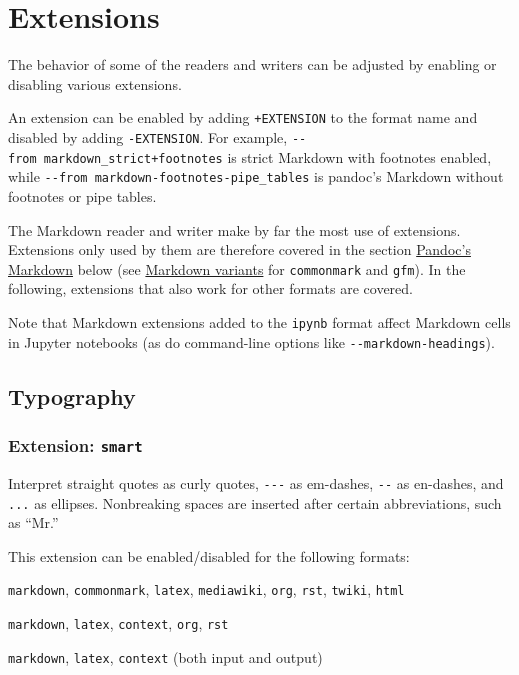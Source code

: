 \documentclass[
]{article}
\providecommand{\tightlist}{%
  \setlength{\itemsep}{0pt}\setlength{\parskip}{0pt}}
\begin{document}
\hypertarget{extensions}{%
\section{Extensions}\label{extensions}}

The behavior of some of the readers and writers can be adjusted by
enabling or disabling various extensions.

An extension can be enabled by adding \texttt{+EXTENSION} to the format
name and disabled by adding \texttt{-EXTENSION}. For example,
\texttt{-\/-from\ markdown\_strict+footnotes} is strict Markdown with
footnotes enabled, while
\texttt{-\/-from\ markdown-footnotes-pipe\_tables} is pandoc's Markdown
without footnotes or pipe tables.

The Markdown reader and writer make by far the most use of extensions.
Extensions only used by them are therefore covered in the section
\protect\hyperlink{pandocs-markdown}{Pandoc's Markdown} below (see
\protect\hyperlink{markdown-variants}{Markdown variants} for
\texttt{commonmark} and \texttt{gfm}). In the following, extensions that
also work for other formats are covered.

Note that Markdown extensions added to the \texttt{ipynb} format affect
Markdown cells in Jupyter notebooks (as do command-line options like
\texttt{-\/-markdown-headings}).

\hypertarget{typography}{%
\subsection{Typography}\label{typography}}

\hypertarget{extension-smart}{%
\subsubsection{\texorpdfstring{Extension:
\texttt{smart}}{Extension: smart}}\label{extension-smart}}

Interpret straight quotes as curly quotes, \texttt{-\/-\/-} as
em-dashes, \texttt{-\/-} as en-dashes, and \texttt{...} as ellipses.
Nonbreaking spaces are inserted after certain abbreviations, such as
``Mr.''

This extension can be enabled/disabled for the following formats:

\begin{description}
\tightlist
\item[input formats]
\texttt{markdown}, \texttt{commonmark}, \texttt{latex},
\texttt{mediawiki}, \texttt{org}, \texttt{rst}, \texttt{twiki},
\texttt{html}
\item[output formats]
\texttt{markdown}, \texttt{latex}, \texttt{context}, \texttt{org},
\texttt{rst}
\item[enabled by default in]
\texttt{markdown}, \texttt{latex}, \texttt{context} (both input and
output)
\end{description}
\end{document}
